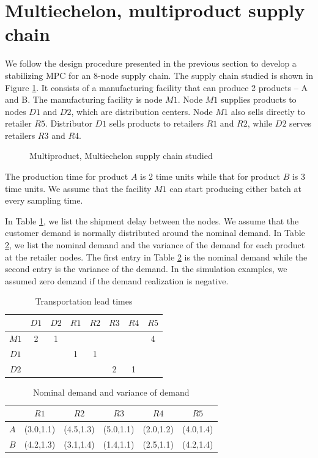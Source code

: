 \documentclass{elsarticle}
\theoremstyle{definition}
\begin{document}
\section{Multiechelon, multiproduct supply chain}
\label{sec:multi}
We follow the design procedure presented in the previous section to
develop a stabilizing MPC for an 8-node supply chain. The supply chain
studied is shown in Figure \ref{fig:esc:lssc}. It consists of a
manufacturing facility that can produce 2 products -- A and B. The
manufacturing facility is node $M1$. Node $M1$ supplies products to
nodes $D1$ and $D2$, which are distribution centers. Node $M1$ also
sells directly to retailer $R5$. Distributor $D1$ sells products to
retailers $R1$ and $R2$, while $D2$ serves retailers $R3$ and $R4$. 


\begin{figure}
\centering
\scriptsize
{\resizebox{0.5\textwidth}{!}{}}
\caption{Multiproduct, Multiechelon supply chain studied}
\label{fig:esc:lssc}
\end{figure}

The production time for product $A$ is 2 time units while that for product $B$ is 3 time units. We assume that the facility $M1$ can start producing either batch at every sampling time. 

In Table \ref{tab:esc:translead}, we list the shipment delay between
the nodes. We assume that the customer demand is normally distributed
around the nominal demand. In Table \ref{tab:esc:dem}, we list the
nominal demand and the variance  of the demand for each product at the
retailer nodes. The first entry in Table \ref{tab:esc:dem} is the
nominal demand while the second entry is the variance of the
demand. In the simulation examples, we assumed zero demand if the
demand realization is negative. 

\begin{table}
\caption{Transportation lead times}
\label{tab:esc:translead}
\centering
\begin{tabular}{cccccccc}\toprule
& $D1$ & $D2$  & $R1$ & $R2$ & $R3$ & $R4$ & $R5$ \\
\midrule
$M1$ &2&1& & & & &4\\
$D1$ & & &1&1& & & \\
$D2$ & & & & &2&1& \\
\bottomrule
\end{tabular}
\end{table}
\begin{table}
\caption{Nominal demand and variance of demand}
\centering
\begin{tabular}{cccccc}\toprule
\label{tab:esc:dem}
 &$R1$&$R2$&$R3$&$R4$&$R5$\\
\midrule
$A$&(3.0,1.1)&(4.5,1.3)&(5.0,1.1)&(2.0,1.2)&(4.0,1.4)\\
$B$&(4.2,1.3)&(3.1,1.4)&(1.4,1.1)&(2.5,1.1)&(4.2,1.4)\\
\bottomrule
\end{tabular}
\end{table}
\end{document}
